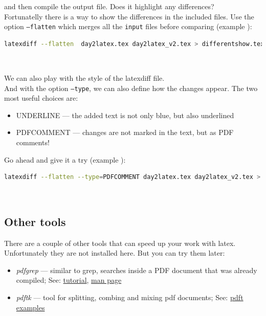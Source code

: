 \documentclass[a4paper,10pt]{report} %
\begin{document}
and then compile the output file. Does it highlight any differences?\\

Fortunatelly there is a way to show the differences in the included files. Use the option \texttt{--flatten} which merges all the \texttt{input} files before comparing  (example ):
\begin{lstlisting}[language={bash}, frame=single,basicstyle=\footnotesize]
  latexdiff --flatten  day2latex.tex day2latex_v2.tex > differentshow.tex
\end{lstlisting}~\vspace{1ex}

We can also play with the style of the latexdiff file. \\


And with the option \texttt{--type}, we can also define how the changes appear. The two most useful choices are:
\begin{itemize}
 \item UNDERLINE --- the added text is not only blue, but also underlined 
 \item PDFCOMMENT --- changes are not marked in the text, but as PDF comments! 
\end{itemize}

Go ahead and give it a try  (example ):

\begin{lstlisting}[language={bash}, frame=single,basicstyle=\footnotesize]
  latexdiff --flatten --type=PDFCOMMENT day2latex.tex day2latex_v2.tex > differentcom.tex
\end{lstlisting}~\vspace{0ex}

\subsection{Other tools}

There are a couple of other tools that can speed up your work with latex.
Unfortunately they are not installed here. But you can try them later:
\begin{itemize}
    \item \emph{pdfgrep} --- similar to grep, searches inside a PDF document that was already compiled; See: \href{https://www.geeksforgeeks.org/pdfgrep-command-in-linux/}{tutorial},  \href{https://pdfgrep.org/doc.html}{man page}
    \item \emph{pdftk} --- tool for splitting, combing and mixing pdf documents; See: \href{https://www.pdflabs.com/docs/pdftk-cli-examples/}{pdft examples}
\end{itemize}
\end{document}
